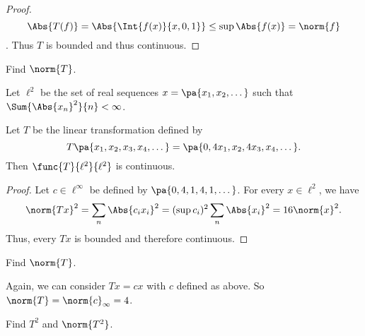 \documentclass[12pt,letterpaper,twoside]{hmcpset}
\begin{document}
\begin{solution}
 \begin{proof}
  \[\Abs{T(f)} = \Abs{\Int{f(x)}{x,0,1}} \leq \sup\Abs{f(x)} = \norm{f}\].
  Thus $T$ is bounded and thus continuous.
 \end{proof}

\end{solution}


\begin{problem}[7b]
 Find $\norm{T}$.
\end{problem}

\begin{problem}[8][15]
 Let $\ell^2$ be the set of real sequences $x = \pa{x_1,x_2,\dotsc}$ such that $\Sum{\Abs{x_n}^2}{n} < \infty$.
\end{problem}

\begin{problem}[8a]
 Let $T$ be the linear transformation defined by \[T\pa{x_1,x_2,x_3,x_4,\dotsc} = \pa{0,4x_1,x_2,4x_3,x_4,\dotsc}.\] Then $\func{T}{\ell^2}{\ell^2}$ is continuous.
\end{problem}

\begin{solution}
 \begin{proof}
  Let $c \in \ell^\infty$ be defined by $\pa{0,4,1,4,1,\dotsc}$. For every $x 
\in \ell^2$, we have 
  \[\norm{Tx}^2 = \sum_n\Abs{c_i x_i}^2 = (\sup c_i)^2 \sum_n 
\Abs{x_i}^2=16\norm{x}^2.\]
Thus, every $Tx$ is bounded and therefore continuous.
 \end{proof}

\end{solution}


\begin{problem}[8b]
 Find $\norm{T}$.
\end{problem}

\begin{solution}
 Again, we can consider $Tx = cx$ with $c$ defined as above. So $\norm{T} = 
\norm{c}_\infty = 4$.
\end{solution}


\begin{problem}
 Find $T^2$ and $\norm{T^2}$.
\end{problem}
\end{document}
